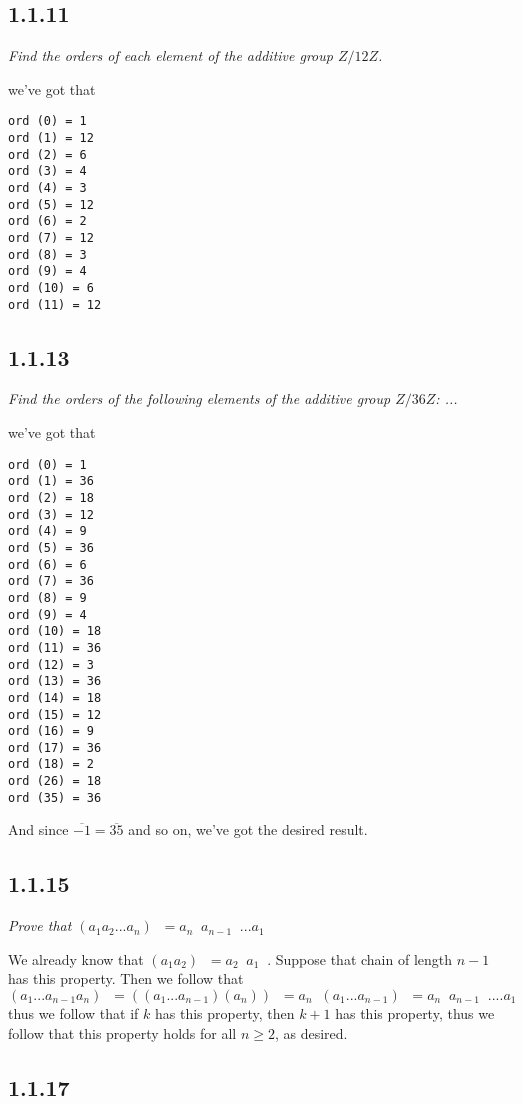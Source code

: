 \documentclass[11pt,oneside,titlepage]{book}
\DeclareMathOperator \inv {^{-1}}
\begin{document}
\subsection*{1.1.11}

\textit{Find the orders of each element of the additive group $Z/12Z$.}

we've got that
\begin{verbatim}
ord (0) = 1
ord (1) = 12
ord (2) = 6
ord (3) = 4
ord (4) = 3
ord (5) = 12
ord (6) = 2
ord (7) = 12
ord (8) = 3
ord (9) = 4
ord (10) = 6
ord (11) = 12
\end{verbatim}

\subsection*{1.1.13}

\textit{Find the orders of the following elements of the additive group $Z/36Z$:
  ...}

we've got that 
\begin{verbatim}
ord (0) = 1
ord (1) = 36
ord (2) = 18
ord (3) = 12
ord (4) = 9
ord (5) = 36
ord (6) = 6
ord (7) = 36
ord (8) = 9
ord (9) = 4
ord (10) = 18
ord (11) = 36
ord (12) = 3
ord (13) = 36
ord (14) = 18
ord (15) = 12
ord (16) = 9
ord (17) = 36
ord (18) = 2
ord (26) = 18
ord (35) = 36
\end{verbatim}

And since $\overline{-1} = \overline{35}$ and so on, we've got the desired result.

\subsection*{1.1.15}

\textit{Prove that $(a_1 a_2 ... a_n)\inv = a_n \inv a_{n - 1}\inv ... a_1 \inv$}

We already know that $(a_1 a_2)\inv = a_2 \inv a_1 \inv$. Suppose that chain of length $n - 1$
has this property. Then we follow that
$$ (a_1 ... a_{n - 1} a_n )\inv = ((a_1 ... a_{n - 1} )(a_n) )\inv =
a_n \inv (a_1 ... a_{n - 1})\inv = a_n\inv a_{n - 1} \inv .... a_1 \inv$$
thus we follow that if $k$ has this property, then $k + 1$ has this property, thus we follow
that this property holds for all $n \geq 2$, as desired.

\subsection*{1.1.17}
\end{document}
